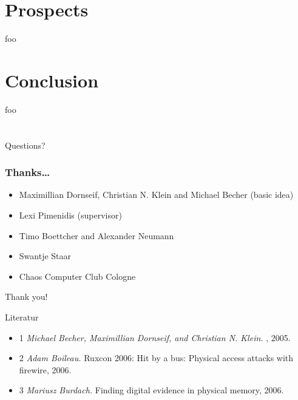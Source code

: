 \documentclass{beamer}
\newenvironment{itemizeframe}[1]
  {\begin{frame}{#1}\startitemizeframe}
  {\stopitemizeframe\end{frame}}
\newcommand\startitemizeframe{\begin{itemize}}
\newcommand\stopitemizeframe{\end{itemize}}
\begin{document}
\section{Prospects}

	\begin{frame}
		foo
	\end{frame}

\section{Conclusion}

	\begin{frame}
		foo
	\end{frame}

\section*{}

	\begin{frame}
		Questions?
	\end{frame}

	\begin{frame}
		\frametitle{Thanks\ldots}
		\begin{itemize}
			\item Maximillian Dornseif, Christian N. Klein and Michael Becher (basic idea)
			\item Lexi Pimenidis (supervisor)
			\item Timo Boettcher and Alexander Neumann
			\item Swantje Staar
			\item Chaos Computer Club Cologne
		\end{itemize}
		Thank you!
	\end{frame}

	\begin{itemizeframe}{Literatur}
		\item[1] \emph{Michael Becher, Maximillian Dornseif, and Christian N.
			Klein.} , 2005.

		\item[2] \emph{Adam Boileau.} Ruxcon 2006: Hit by a bus: Physical access attacks with
			firewire, 2006.

		\item[3] \emph{Mariusz Burdach.} Finding digital evidence in physical memory, 2006.
	\end{itemizeframe}
\end{document}
